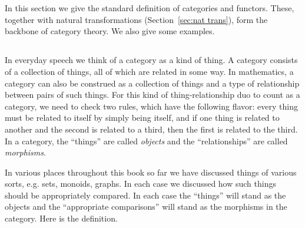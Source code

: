 \documentclass[../main/CT4S-EN-RU]{subfiles}
\begin{document}
\section{}

\begin{blockENG}
In this section we give the standard definition of categories and functors. These, together with natural transformations (Section~\ref{sec:nat trans}), form the backbone of category theory. We also give some examples.
\end{blockENG}

\begin{blockRUS}
\end{blockRUS}


\subsection{}\label{sec:categories}

\begin{blockENG}
In everyday speech we think of a category as a kind of thing. A category consists of a collection of things, all of which are related in some way. In mathematics, a category can also be construed as a collection of things and a type of relationship between pairs of such things. For this kind of thing-relationship duo to count as a category, we need to check two rules, which have the following flavor: every thing must be related to itself by simply being itself, and if one thing is related to another and the second is related to a third, then the first is related to the third. In a category, the “things” are called {\em objects} and the “relationships” are called {\em morphisms}.
\end{blockENG}

\begin{blockRUS}
\end{blockRUS}

\begin{blockENG}
In various places throughout this book so far we have discussed things of various sorts, e.g. sets, monoids, graphs. In each case we discussed how such things should be appropriately compared. In each case the “things” will stand as the objects and the “appropriate comparisons” will stand as the morphisms in the category. Here is the definition.
\end{blockENG}
\end{document}
